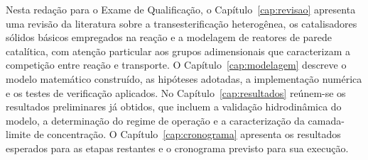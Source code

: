 Nesta redação para o Exame de Qualificação, o Capítulo~\ref{cap:revisao}
apresenta uma revisão da literatura sobre a transesterificação heterogênea, os
catalisadores sólidos básicos empregados na reação e a modelagem de reatores de
parede catalítica, com atenção particular aos grupos adimensionais que
caracterizam a competição entre reação e transporte. O Capítulo~\ref{cap:modelagem}
descreve o modelo matemático construído, as hipóteses adotadas, a implementação
numérica e os testes de verificação aplicados. No Capítulo~\ref{cap:resultados}
reúnem-se os resultados preliminares já obtidos, que incluem a validação
hidrodinâmica do modelo, a determinação do regime de operação e a caracterização
da camada-limite de concentração. O Capítulo~\ref{cap:cronograma} apresenta os
resultados esperados para as etapas restantes e o cronograma previsto para sua
execução.
